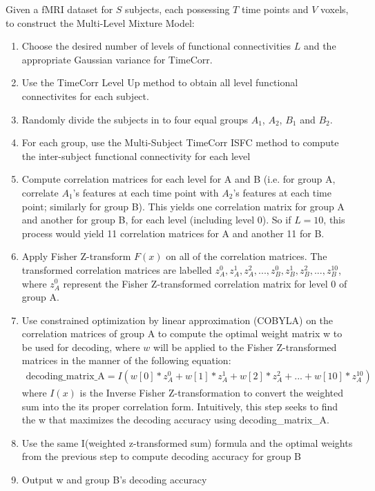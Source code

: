 \documentclass[11pt]{article}
\begin{document}
\begin{enumerate}
Given a fMRI dataset for $S$ subjects, each possessing $T$ time points and $V$ voxels, to construct the Multi-Level Mixture Model:
\begin{enumerate}
\item Choose the desired number of levels of functional connectivities $L$ and the appropriate Gaussian variance for TimeCorr.
\item Use the TimeCorr Level Up method to obtain all level functional connectivites for each subject.
\item Randomly divide the subjects in to four equal groups $A_1$, $A_2$, $B_1$ and $B_2$.
\item For each group, use the Multi-Subject TimeCorr ISFC method to compute the inter-subject functional connectivity for each level
\item Compute correlation matrices for each level for A and B (i.e. for group A, correlate $A_1$'s features at each time point with $A_2$'s features at each time point; similarly for group B). This yields one correlation matrix for group A and another for group B, for each level (including level 0). So if $L=10$, this process would yield 11 correlation matrices for A and another 11 for B.
\item Apply Fisher Z-transform $F(x)$ on all of the correlation matrices. The transformed correlation matrices are labelled $z_{A}^0, z_{A}^1, z_{A}^2, ..., z_{B}^0, z_{B}^1, z_{B}^2, ..., z_{B}^{10}$, where $z_{A}^0$ represent the Fisher Z-transformed correlation matrix for level 0 of group A.
\item Use constrained optimization by linear approximation (COBYLA) on the correlation matrices of group A to compute the optimal weight matrix w to be used for decoding, where $w$ will be applied to the Fisher Z-transformed matrices in the manner of the following equation:
\begin{align*}
\text{decoding\_matrix\_A} = I(w[0]*z_A^0 + w[1]*z_A^1 + w[2]*z_A^2 + ... + w[10]*z_A^{10})
\end{align*}
where $I(x)$ is the Inverse Fisher Z-transformation to convert the weighted sum into the its proper correlation form. Intuitively, this step seeks to find the w that maximizes the decoding accuracy using decoding\_matrix\_A.
\item Use the same I(weighted z-transformed sum) formula and the optimal weights from the previous step to compute decoding accuracy for group B
\item Output w and group B's decoding accuracy
\end{enumerate}


\end{enumerate}
\end{document}
